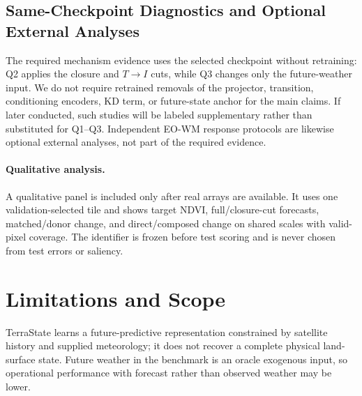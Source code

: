 \documentclass[letterpaper]{article} %
\begin{document}

\subsection{Same-Checkpoint Diagnostics and Optional External Analyses}

The required mechanism evidence uses the selected checkpoint without
retraining: Q2 applies the closure and $T\!\rightarrow I$ cuts, while Q3 changes
only the future-weather input. We do not require retrained removals of the
projector, transition, conditioning encoders, KD term, or future-state anchor
for the main claims. If later conducted, such studies will be labeled
supplementary rather than substituted for Q1--Q3. Independent EO-WM response
protocols \cite{luo2026eowm} are likewise optional external analyses, not part
of the required evidence.

\paragraph{Qualitative analysis.}
A qualitative panel is included only after real arrays are available. It uses
one validation-selected tile and shows target NDVI, full/closure-cut forecasts,
matched/donor change, and direct/composed change on shared scales with
valid-pixel coverage. The identifier is frozen before test scoring and is
never chosen from test errors or saliency.

\section{Limitations and Scope}

TerraState learns a future-predictive representation constrained by satellite
history and supplied meteorology; it does not recover a complete physical
land-surface state. Future weather in the benchmark is an oracle exogenous
input, so operational performance with forecast rather than observed weather
may be lower.
\end{document}
